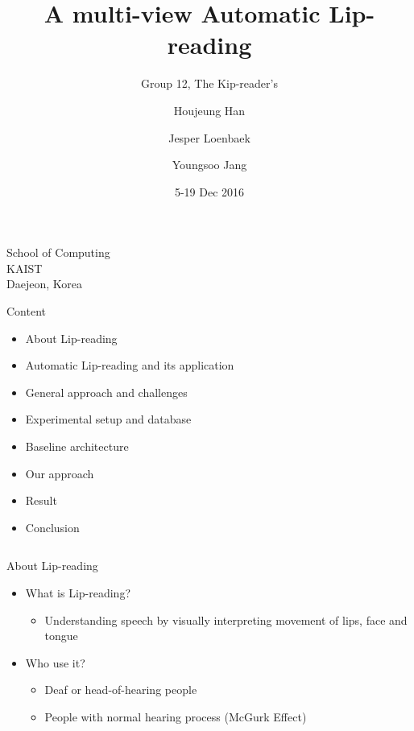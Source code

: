 \documentclass[xcolor=table]{beamer}
\begin{document}
\title{A multi-view Automatic Lip-reading}
\subtitle{Group 12, The Kip-reader's}
\author{Houjeung Han \and Jesper Loenbaek \and Youngsoo Jang}
\institute%
{
    School of Computing\\
    KAIST\\
    Daejeon, Korea
}

\date{5-19 Dec 2016}
\frame{\titlepage}

\begin{frame}{Content}
    \begin{itemize}
        \item About Lip-reading
        \item Automatic Lip-reading and its application
        \item General approach and challenges
        \item Experimental setup and database
        \item Baseline architecture
        \item Our approach
        \item Result 
        \item Conclusion 
    \end{itemize}
    \vspace{0.5cm}
    \begin{columns}[T]
    \end{columns}
\end{frame}

\begin{frame}{About Lip-reading}
    \begin{itemize}
        \item What is Lip-reading?
        \begin{itemize}
            \item Understanding speech by visually interpreting movement of lips, face and tongue
        \end{itemize}
    \end{itemize}
    \begin{itemize}
        \item Who use it?
        \begin{itemize}
            \item Deaf or head-of-hearing people
            \item People with normal hearing process (McGurk Effect)
        \end{itemize}
    \end{itemize}
\end{frame}
\end{document}
